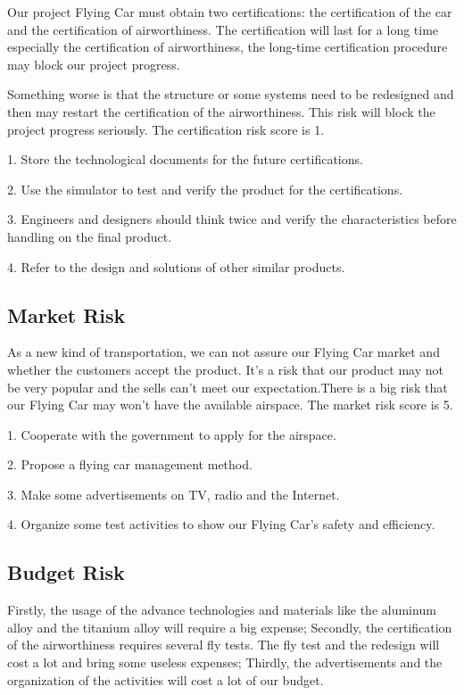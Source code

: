 Our project Flying Car must obtain two certifications: the certification of the car and the certification of airworthiness. The certification will last for a long time especially the certification of airworthiness, the long-time certification procedure may block our project progress.

Something worse is that the structure or some systems need to be redesigned and then may restart the certification of the airworthiness. This risk will block the project progress seriously. The certification risk score is 1.

1. Store the technological documents for the future certifications.

2. Use the simulator to test and verify the product for the certifications.

3. Engineers and designers should think twice and verify the characteristics before handling on the final product.

4. Refer to the design and solutions of other similar products.

\subsection{Market Risk}

As a new kind of transportation, we can not assure our Flying Car market and whether the customers accept the product. It’s a risk that our product may not be very popular and the sells can’t meet our expectation.There is a big risk that our Flying Car may won’t have the available airspace. The market risk score is 5.

1. Cooperate with the government to apply for the airspace.

2. Propose a flying car management method.

3. Make some advertisements on TV, radio and the Internet.

4. Organize some test activities to show our Flying Car’s safety and efficiency.

\subsection{Budget Risk}

Firstly, the usage of the advance technologies and materials like the aluminum alloy and the titanium alloy will require a big expense; Secondly, the certification of the airworthiness requires several fly tests. The fly test and the redesign will cost a lot and bring some useless expenses; Thirdly, the advertisements and the organization of the activities will cost a lot of our budget.

